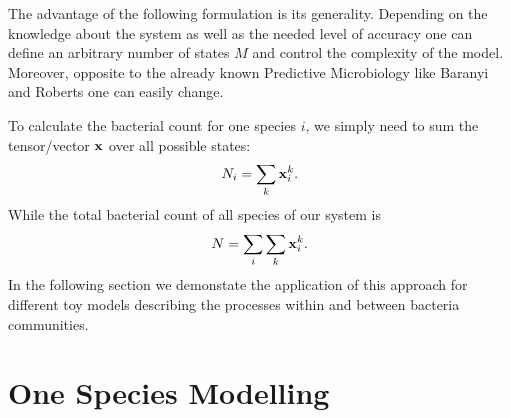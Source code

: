 \documentclass[10pt,A4paper]{article}
\begin{document}
The advantage of the following formulation is its generality. 
Depending on the knowledge about the system as well as the needed level of accuracy one can define an arbitrary number of states $M$ and control the complexity of the model.
Moreover, opposite to the already known Predictive Microbiology like Baranyi and Roberts one can easily change.

To calculate the bacterial count for one species $i$, we simply need to sum the tensor/vector $\mathbf{x}$ over all possible states:
\begin{equation}
    N_i = \sum_k \mathbf{x}_i^k.
\end{equation}
While the total bacterial count of all species of our system is
\begin{equation}
    N = \sum_i \sum_k \mathbf{x}_i^k.
\end{equation}
In the following section we demonstate the application of this approach for different toy models describing the processes within and between bacteria communities.
\newpage
%
%
\section{One Species Modelling}
\end{document}
